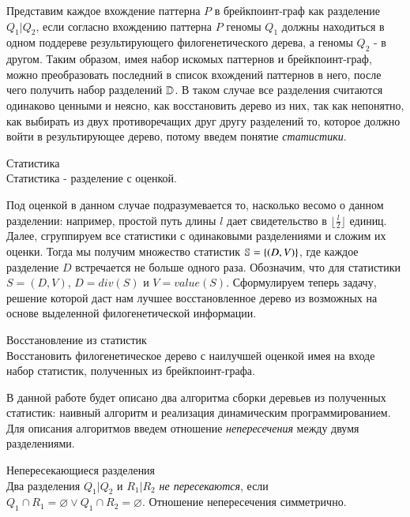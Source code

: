 Представим каждое вхождение паттерна $P$ в брейкпоинт-граф как разделение $Q_1|Q_2$,
если согласно вхождению паттерна $P$ геномы $Q_1$ должны находиться в одном поддереве результирующего филогенетического дерева,
а геномы $Q_2$ - в другом.
Таким образом, имея набор искомых паттернов и брейкпоинт-граф, можно преобразовать последний в список вхождений паттернов в него,
после чего получить набор разделений $\mathbb{D}$.
В таком случае все разделения считаются одинаково ценными и неясно, как восстановить дерево из них, так как непонятно,
как выбирать из двух противоречащих друг другу разделений то, которое должно войти в результирующее дерево,
потому введем понятие \textit{статистики}.
\begin{define}{Статистика}\\
  Статистика - разделение с оценкой.
\end{define}
Под оценкой в данном случае подразумевается то, насколько весомо  о данном разделении:
например, простой путь длины $l$ дает свидетельство в $\lfloor\frac{l}{2}\rfloor$ единиц.
Далее, сгруппируем все статистики с одинаковыми разделениями и сложим их оценки.
Тогда мы получим множество статистик $\mathbb{S} = \{(D, V)\}$, где каждое разделение $D$ встречается не больше одного раза.
Обозначим, что для статистики $S = (D, V)$, $D = div(S)$ и $V = value(S)$.
Сформулируем теперь задачу, решение которой даст нам лучшее восстановленное дерево из возможных на основе выделенной филогенетической информации.
\begin{task}{Восстановление из статистик} \\
  Восстановить филогенетическое дерево с наилучшей оценкой имея на входе набор статистик,
  полученных из брейкпоинт-графа.
\end{task}

В данной работе будет описано два алгоритма сборки деревьев из полученных статистик:
наивный алгоритм и реализация динамическим программированием.
Для описания алгоритмов введем отношение \textit{непересечения} между двумя разделениями.
\begin{define}{Непересекающиеся разделения} \\
  Два разделения $Q_1|Q_2$ и $R_1|R_2$ \textit{не пересекаются},
  если $Q_1 \cap R_1 = \varnothing \lor Q_1 \cap R_2 = \varnothing $.
  Отношение непересечения симметрично.
\end{define}

